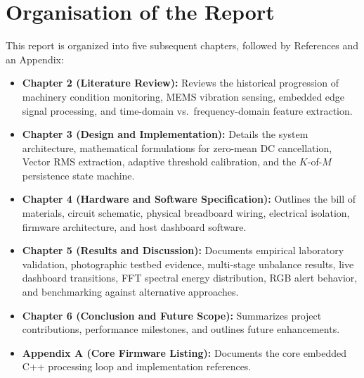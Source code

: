 \section{Organisation of the Report}
\hspace{2em}This report is organized into five subsequent chapters, followed by References and an Appendix:
\begin{itemize}
    \item \textbf{Chapter 2 (Literature Review):} Reviews the historical progression of machinery condition monitoring, MEMS vibration sensing, embedded edge signal processing, and time-domain vs.\ frequency-domain feature extraction.
    \item \textbf{Chapter 3 (Design and Implementation):} Details the system architecture, mathematical formulations for zero-mean DC cancellation, Vector RMS extraction, adaptive threshold calibration, and the $K$-of-$M$ persistence state machine.
    \item \textbf{Chapter 4 (Hardware and Software Specification):} Outlines the bill of materials, circuit schematic, physical breadboard wiring, electrical isolation, firmware architecture, and host dashboard software.
    \item \textbf{Chapter 5 (Results and Discussion):} Documents empirical laboratory validation, photographic testbed evidence, multi-stage unbalance results, live dashboard transitions, FFT spectral energy distribution, RGB alert behavior, and benchmarking against alternative approaches.
    \item \textbf{Chapter 6 (Conclusion and Future Scope):} Summarizes project contributions, performance milestones, and outlines future enhancements.
    \item \textbf{Appendix A (Core Firmware Listing):} Documents the core embedded C++ processing loop and implementation references.
\end{itemize}
\clearpage
